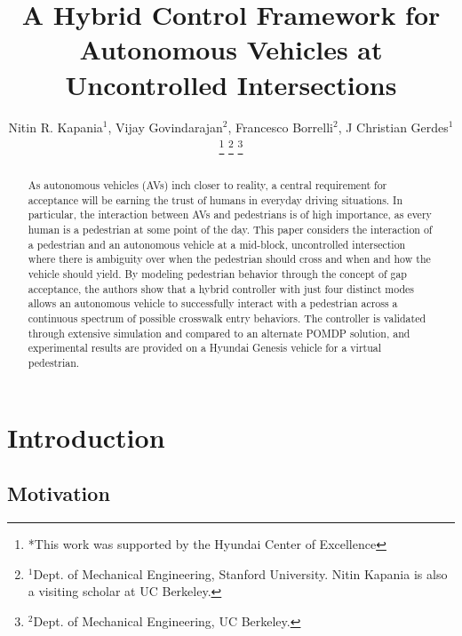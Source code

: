 \documentclass[letterpaper, 10 pt, conference]{ieeeconf}  %
\title{\LARGE \bf
A Hybrid Control Framework for Autonomous Vehicles at Uncontrolled Intersections}
\author{Nitin R. Kapania$^{1}$, Vijay Govindarajan$^{2}$, Francesco Borrelli$^{2}$, J Christian Gerdes$^{1}$%
\thanks{*This work was supported by the Hyundai Center of Excellence}%
\thanks{$^{1}$Dept. of Mechanical Engineering, Stanford University. Nitin Kapania is also a visiting scholar at UC Berkeley.}%
\thanks{$^{2}$Dept. of Mechanical Engineering, UC Berkeley.}%
}
\begin{document}
\maketitle
\thispagestyle{empty}
\pagestyle{empty}


\begin{abstract}

As autonomous vehicles (AVs) inch closer to reality, a central requirement for acceptance will be earning the trust of humans in everyday driving situations. In particular, the interaction between AVs and pedestrians is of
high importance, as every human is a pedestrian at some point of the day. This paper considers the interaction of a pedestrian and an autonomous vehicle at a mid-block, uncontrolled intersection where there is ambiguity
over when the pedestrian should cross and when and how the vehicle should yield. By modeling pedestrian behavior through the concept of gap acceptance, the authors show that a hybrid controller with just four distinct modes allows an autonomous vehicle to successfully interact with a pedestrian across a continuous spectrum of possible crosswalk entry behaviors. The controller is validated through extensive simulation and compared to an alternate POMDP solution, and experimental results are provided on a Hyundai Genesis vehicle for a virtual pedestrian.  

\end{abstract}


\section{Introduction}

\subsection{Motivation}
\end{document}
